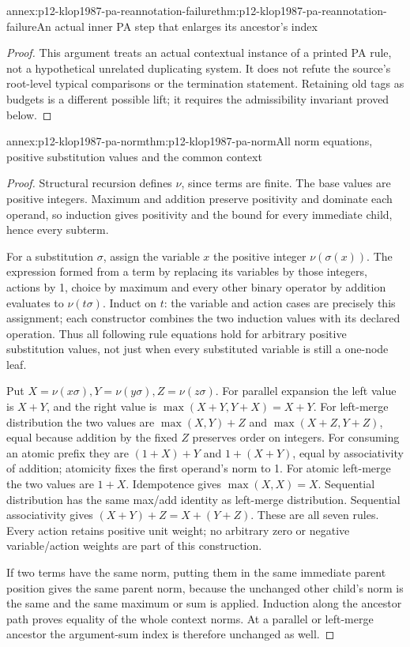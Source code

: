 \begin{annexitem}{annex:p12-klop1987-pa-reannotation-failure}{thm:p12-klop1987-pa-reannotation-failure}{An actual inner PA step that enlarges its ancestor's index}
\begin{proof}
This argument treats an actual contextual instance of a printed
PA rule, not a hypothetical unrelated duplicating system. It does
not refute the source's root-level typical comparisons or the
termination statement. Retaining old tags as budgets is a different
possible lift; it requires the admissibility invariant proved below.
\end{proof}
\end{annexitem}

\begin{annexitem}{annex:p12-klop1987-pa-norm}{thm:p12-klop1987-pa-norm}{All norm equations, positive substitution values and the common context}
\begin{proof}
Structural recursion defines \(\nu\), since terms are finite.
The base values are positive integers. Maximum and addition preserve
positivity and dominate each operand, so induction gives positivity
and the bound for every immediate child, hence every subterm.

For a substitution \(\sigma\), assign the variable \(x\) the
positive integer \(\nu(\sigma(x))\). The expression formed
from a term by replacing its variables by those integers, actions
by 1, choice by maximum and every other binary operator by addition
evaluates to \(\nu(t\sigma)\). Induct on \(t\): the variable
and action cases are precisely this assignment; each constructor
combines the two induction values with its declared operation.
Thus all following rule equations hold for arbitrary positive
substitution values, not just when every substituted variable is
still a one-node leaf.

Put \(X=\nu(x\sigma),Y=\nu(y\sigma),Z=\nu(z\sigma)\).
For parallel expansion the left value is \(X+Y\), and the
right value is \(\max(X+Y,Y+X)=X+Y\). For left-merge
distribution the two values are
\(\max(X,Y)+Z\) and \(\max(X+Z,Y+Z)\), equal because
addition by the fixed \(Z\) preserves order on integers.
For consuming an atomic prefix they are
\((1+X)+Y\) and \(1+(X+Y)\), equal by associativity of
addition; atomicity fixes the first operand's norm to 1.
For atomic left-merge the two values are \(1+X\).
Idempotence gives \(\max(X,X)=X\). Sequential distribution
has the same max/add identity as left-merge distribution.
Sequential associativity gives \((X+Y)+Z=X+(Y+Z)\).
These are all seven rules. Every action retains positive unit
weight; no arbitrary zero or negative variable/action weights
are part of this construction.

If two terms have the same norm, putting them in the same immediate
parent position gives the same parent norm, because the unchanged
other child's norm is the same and the same maximum or sum is
applied. Induction along the ancestor path proves equality of the
whole context norms. At a parallel or left-merge ancestor the
argument-sum index is therefore unchanged as well.


\end{proof}
\end{annexitem}
